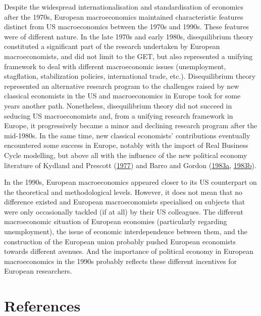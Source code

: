 \documentclass[
]{article}
\begin{document}
Despite the widespread internationalisation and standardisation of
economics after the 1970s, European macroeconomics maintained
characteristic features distinct from US macroeconomics between the
1970s and 1990s. These features were of different nature. In the late
1970s and early 1980s, disequilibrium theory constituted a significant
part of the research undertaken by European macroeconomists, and did not
limit to the GET, but also represented a unifying framework to deal with
different macroeconomic issues (unemployment, stagflation, stabilization
policies, international trade, etc.). Disequilibrium theory represented
an alternative research program to the challenges raised by new
classical economists in the US and macroeconomics in Europe took for
some years another path. Nonetheless, disequilibrium theory did not
succeed in seducing US macroeconomists and, from a unifying research
framework in Europe, it progressively became a minor and declining
research program after the mid-1980s. In the same time, new classical
economists' contributions eventually encountered some success in Europe,
notably with the import of Real Business Cycle modelling, but above all
with the influence of the new political economy literature of Kydland
and Prescott (\protect\hyperlink{ref-kydland1977}{1977}) and Barro and
Gordon (\protect\hyperlink{ref-barro1983}{1983a},
\protect\hyperlink{ref-barro1983c}{1983b}).

In the 1990s, European macroeconomics appeared closer to its US
counterpart on the theoretical and methodological levels. However, it
does not mean that no difference existed and European macroeconomists
specialised on subjects that were only occasionally tackled (if at all)
by their US colleagues. The different macroeconomic situation of
European economies (particularly regarding unemployment), the issue of
economic interdependence between them, and the construction of the
European union probably pushed European economists towards different
avenues. And the importance of political economy in European
macroeconomics in the 1990s probably reflects these different incentives
for European researchers.

\newpage

\hypertarget{references}{%
\section*{References}\label{references}}
\end{document}
